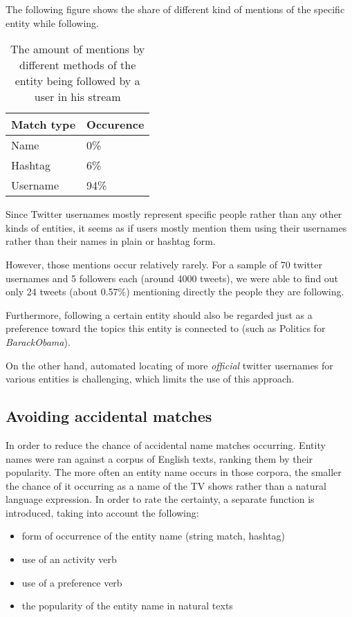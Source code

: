 The following figure shows the share of different kind of mentions of the specific entity while following.

\begin{table}[h!]
  \begin{center}
  \begin{tabular}{ | p{3cm}| p{2cm} | } \hline
    Match type & Occurence \\ \hline
    Name & 0\% \\ \hline
    Hashtag & 6\% \\ \hline
    Username & 94\% \\ \hline
  \end{tabular}
  \caption{The amount of mentions by different methods of the entity being followed by a user in his stream}
  \end{center}
\end{table}

Since Twitter usernames mostly represent specific people rather than any other kinds of entities, it seems as if users mostly
mention them using their usernames rather than their names in plain or hashtag form.

However, those mentions occur relatively rarely. For a sample of 70 twitter usernames and 5 followers each
(around 4000 tweets), we were able to find out only 24 tweets (about 0.57\%) mentioning directly the people they are following.

Furthermore, following a certain entity should also be regarded just as a preference toward the topics this entity is connected to (such as Politics for \textit{BarackObama}).

On the other hand, automated locating of more \textit{official} twitter usernames for various entities is challenging, which
limits the use of this approach.

\subsection{Avoiding accidental matches}
In order to reduce the chance of accidental name matches occurring. Entity names were ran against a corpus of English texts,
ranking them by their popularity. The more often an entity name occurs in those corpora, the smaller the chance of it occurring as a name of the TV shows rather than a natural language expression. In order to rate the certainty, a separate function is introduced, taking into account the following:

\begin{itemize}
  \item form of occurrence of the entity name (string match, hashtag)
  \item use of an activity verb
  \item use of a preference verb
  \item the popularity of the entity name in natural texts
\end{itemize}

